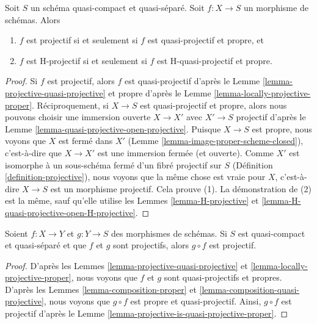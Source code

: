 \begin{lemma}
\label{lemma-projective-is-quasi-projective-proper}
Soit $S$ un schéma quasi-compact et quasi-séparé.
Soit $f : X \to S$ un morphisme de schémas. Alors
\begin{enumerate}
\item $f$ est projectif si et seulement si $f$ est quasi-projectif et propre, et
\item $f$ est H-projectif si et seulement si $f$ est H-quasi-projectif et propre.
\end{enumerate}
\end{lemma}

\begin{proof}
Si $f$ est projectif, alors $f$ est quasi-projectif
d'après le Lemme \ref{lemma-projective-quasi-projective} et propre d'après le
Lemme \ref{lemma-locally-projective-proper}. Réciproquement, si $X \to S$ est quasi-projectif
et propre, alors nous pouvons choisir une immersion
ouverte $X \to X'$ avec $X' \to S$ projectif d'après le
Lemme \ref{lemma-quasi-projective-open-projective}. Puisque $X \to S$ est propre, nous
voyons que $X$ est fermé dans $X'$ (Lemme \ref{lemma-image-proper-scheme-closed}),
c'est-à-dire que $X \to X'$ est une immersion
fermée (et ouverte). Comme $X'$ est
isomorphe à un sous-schéma fermé d'un fibré projectif sur $S$
(Définition \ref{definition-projective}), nous voyons que la même
chose est vraie pour $X$, c'est-à-dire
$X \to S$ est un morphisme projectif. Cela
prouve (1). La démonstration de (2) est
la même, sauf qu'elle utilise
les Lemmes \ref{lemma-H-projective} et \ref{lemma-H-quasi-projective-open-H-projective}.
\end{proof}

\begin{lemma}
\label{lemma-composition-projective}
Soient $f : X \to Y$ et $g : Y \to S$ des morphismes de schémas. Si $S$
est quasi-compact et quasi-séparé et que $f$ et $g$ sont projectifs,
alors $g \circ f$ est projectif.
\end{lemma}

\begin{proof}
D'après les Lemmes \ref{lemma-projective-quasi-projective} et \ref{lemma-locally-projective-proper},
nous voyons que $f$
et $g$ sont quasi-projectifs et
propres. D'après les Lemmes \ref{lemma-composition-proper}
et \ref{lemma-composition-quasi-projective}, nous voyons
que $g \circ f$ est propre et quasi-projectif.
Ainsi, $g \circ f$
est projectif d'après le Lemme \ref{lemma-projective-is-quasi-projective-proper}.
\end{proof}

